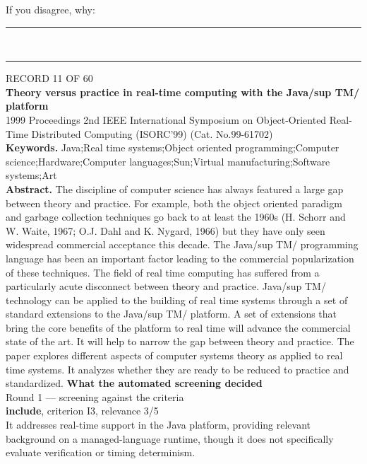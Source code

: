 \documentclass[11pt,a4paper]{article}
\begin{document}
{\footnotesize\color{soft}If you disagree, why:}\\[1mm]
\color{rule}\rule{\linewidth}{0.3pt}\\[3mm]\rule{\linewidth}{0.3pt}\color{black}
\clearpage
{\color{soft}\footnotesize RECORD 11 OF 60}\\[1mm]
{\large\bfseries Theory versus practice in real-time computing with the Java/sup TM/ platform}\\[1.5mm]
{\color{soft}\small 1999 \textperiodcentered{} Proceedings 2nd IEEE International Symposium on Object-Oriented Real-Time Distributed Computing (ISORC'99) (Cat. No.99-61702)}\\[2mm]
{\small\textbf{Keywords.} Java;Real time systems;Object oriented programming;Computer science;Hardware;Computer languages;Sun;Virtual manufacturing;Software systems;Art}\\[2mm]
{\small\textbf{Abstract.} The discipline of computer science has always featured a large gap between theory and practice. For example, both the object oriented paradigm and garbage collection techniques go back to at least the 1960s (H. Schorr and W. Waite, 1967; O.J. Dahl and K. Nygard, 1966) but they have only seen widespread commercial acceptance this decade. The Java/sup TM/ programming language has been an important factor leading to the commercial popularization of these techniques. The field of real time computing has suffered from a particularly acute disconnect between theory and practice. Java/sup TM/ technology can be applied to the building of real time systems through a set of standard extensions to the Java/sup TM/ platform. A set of extensions that bring the core benefits of the platform to real time will advance the commercial state of the art. It will help to narrow the gap between theory and practice. The paper explores different aspects of computer systems theory as applied to real time systems. It analyzes whether they are ready to be reduced to practice and standardized.}
\vspace{3mm}
\vspace{2.5mm}
{\small\textbf{What the automated screening decided}}\\[2mm]
{\footnotesize\color{soft}Round 1 --- screening against the criteria}\\[0.5mm]
{\small\textbf{include}, criterion I3, relevance 3/5}\\[0.5mm]
{\small It addresses real-time support in the Java platform, providing relevant background on a managed-language runtime, though it does not specifically evaluate verification or timing determinism.}\\[2.5mm]
\end{document}
